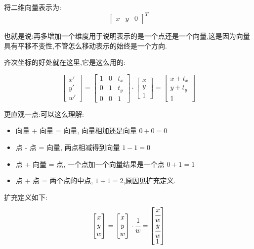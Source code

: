 {{{      将二维向量表示为:
      $$\begin{bmatrix}
          x & y & 0
        \end{bmatrix}^T$$

      也就是说:再多增加一个维度用于说明表示的是一个点还是一个向量,这是因为向量具有平移不变性,不管怎么移动表示的始终是一个方向.

      齐次坐标的好处就在这里,它是这么用的:

      $$\begin{bmatrix}
          x\prime \\
          y\prime \\
          w\prime
        \end{bmatrix}
        =
        \begin{bmatrix}
          1 & 0 & t_x \\
          0 & 1 & t_y \\
          0 & 0 & 1
        \end{bmatrix}
        \cdot
        \begin{bmatrix}
          x \\
          y \\
          1
        \end{bmatrix}
        =
        \begin{bmatrix}
          x + t_x \\
          y + t_y \\
          1
        \end{bmatrix}
      $$

      更直观一点:可以这么理解:
      \begin{itemize}
        \item 向量 + 向量 = 向量, 向量相加还是向量 $0 + 0 = 0$
        \item 点 - 点 = 向量, 两点相减得到向量 $1 - 1 = 0$
        \item 点 + 向量 = 点, 一个点加一个向量结果是一个点 $0 + 1 = 1$
        \item 点 + 点 = 两个点的中点, $1 + 1 = 2$,原因见扩充定义.
      \end{itemize}
      扩充定义如下:
      $$\begin{bmatrix}
          x \\
          y \\
          w
        \end{bmatrix} = \begin{bmatrix}
          x \\
          y \\
          w
        \end{bmatrix}\cdot\cfrac{1}{w} = \begin{bmatrix}
          \cfrac{x}{w} \\
          \cfrac{y}{w} \\
          1
        \end{bmatrix}$$

}}}
